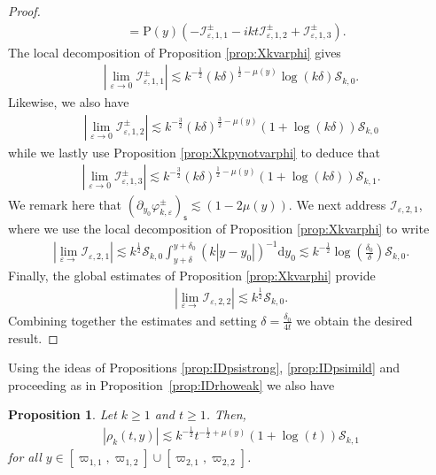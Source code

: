 \documentclass[11pt,reqno]{amsproc}
\newtheorem{proposition}{Proposition}[section]
\theoremstyle{definition}
\numberwithin{equation}{section}
\newcommand{\cI}{{\mathcal I}}
\newcommand{\s}{{\mathsf{s}}}
\newcommand{\cS}{{\mathcal S}}
\renewcommand{\d}{\mathrm{d}}
\newcommand{\ep}{\varepsilon}
\begin{document}
\begin{proof}
\begin{align*}
&= \mathrm{P}(y) \left( -\cI_{\ep,1,1}^\pm - ikt\cI_{\ep,1,2}^\pm + \cI_{\ep,1,3}^\pm \right).
\end{align*}
The local decomposition of Proposition \ref{prop:Xkvarphi} gives
\begin{align*}
\left| \lim_{\ep\rightarrow 0} \cI_{\ep,1,1}^\pm \right| \lesssim k^{-\frac12} (k\delta)^{\frac12-\mu(y)} \log(k\delta)\cS_{k,0}.
\end{align*}
Likewise, we also have
\begin{align*}
\left| \lim_{\ep\rightarrow 0} \cI_{\ep,1,2}^\pm \right| \lesssim k^{-\frac32} (k\delta)^{\frac32-\mu(y)} \left( 1 + \log(k\delta) \right)\cS_{k,0}
\end{align*}
while we lastly use Proposition \ref{prop:Xkpynotvarphi} to deduce that
\begin{align*}
\left| \lim_{\ep\rightarrow 0} \cI_{\ep,1,3}^\pm \right| \lesssim k^{-\frac32} (k\delta)^{\frac12-\mu(y)} \left( 1 + \log(k\delta) \right)\cS_{k,1}.
\end{align*}
We remark here that $\left( \partial_{y_0}\varphi_{k,\ep}^\pm \right)_{\s} \lesssim (1-2\mu(y))$. We next address $\cI_{\ep,2,1}$, where we use the local decomposition of Proposition \ref{prop:Xkvarphi} to write
\begin{align*}
\left| \lim_{\ep\rightarrow} \cI_{\ep,2,1} \right| \lesssim k^{\frac12}\cS_{k,0}\int_{y+\delta}^{y+\delta_0} (k|y-y_0|)^{-1} \d y_0 \lesssim k^{-\frac12}\log\left(\frac{\delta_0}{\delta} \right)\cS_{k,0}.
\end{align*}
Finally, the global estimates of Proposition \ref{prop:Xkvarphi} provide
\begin{align*}
\left| \lim_{\ep\rightarrow} \cI_{\ep,2,2} \right| \lesssim k^\frac12\cS_{k,0}.
\end{align*}
Combining together the estimates and setting $\delta=\frac{\delta_0}{4t}$ we obtain the desired result.
\end{proof}

Using the ideas of Propositions \ref{prop:IDpsistrong}, \ref{prop:IDpsimild} and proceeding as in Proposition~\ref{prop:IDrhoweak} we also have

 \begin{proposition}\label{prop:IDrhomild}
Let $k\geq 1$ and $t\geq 1$. Then,
\begin{align*}
\left| \rho_k(t,y) \right| \lesssim k^{-\frac12}t^{-\frac12+\mu(y)}(1+\log(t))\cS_{k,1}
\end{align*}
for all $y\in [\varpi_{1,1},\varpi_{1,2}]\cup [\varpi_{2,1}, \varpi_{2,2}]$.
\end{proposition}
\end{document}

